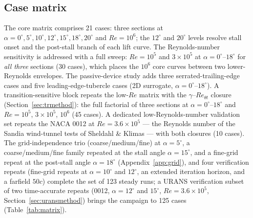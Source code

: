 \documentclass[11pt,a4paper]{article}
\begin{document}
\subsection{Case matrix}
The core matrix comprises 21 cases: three sections at $\alpha = 0^\circ, 5^\circ, 10^\circ, 12^\circ, 15^\circ, 18^\circ, 20^\circ$ and $Re = 10^6$; the $12^\circ$ and $20^\circ$ levels resolve stall onset and the post-stall branch of each lift curve. The Reynolds-number sensitivity is addressed with a full sweep: $Re = 10^5$ and $3\times10^5$ at $\alpha = 0^\circ$--$18^\circ$ for \emph{all three} sections (30 cases), which places the $10^6$ core curves between two lower-Reynolds envelopes. The passive-device study adds three serrated-trailing-edge cases and five leading-edge-tubercle cases (2D surrogate, $\alpha = 0^\circ$--$18^\circ$). A transition-sensitive block repeats the low-$Re$ matrix with the $\gamma$--$Re_{\theta t}$ closure (Section~\ref{sec:trmethod}): the full factorial of three sections at $\alpha = 0^\circ$--$18^\circ$ and $Re = 10^5$, $3\times10^5$, $10^6$ (45 cases). A dedicated low-Reynolds-number validation set repeats the NACA 0012 at $Re = 3.6\times10^5$ --- the Reynolds number of the Sandia wind-tunnel tests of Sheldahl \& Klimas --- with both closures (10 cases). The grid-independence trio (coarse/medium/fine) at $\alpha = 5^\circ$, a coarse/medium/fine family repeated at the stall angle $\alpha = 15^\circ$, and a fine-grid repeat at the post-stall angle $\alpha = 18^\circ$ (Appendix~\ref{app:grid}), and four verification repeats (fine-grid repeats at $\alpha = 10^\circ$ and $12^\circ$, an extended iteration horizon, and a farfield $50c$) complete the set of 123 steady runs; a URANS verification subset of two time-accurate repeats (0012, $\alpha = 12^\circ$ and $15^\circ$, $Re = 3.6\times10^5$, Section~\ref{sec:uransmethod}) brings the campaign to 125 cases (Table~\ref{tab:matrix}).
\end{document}
